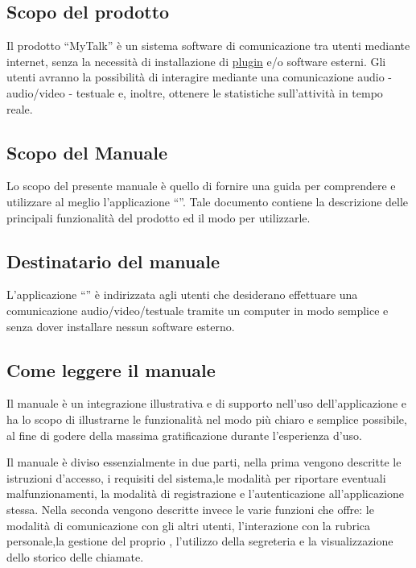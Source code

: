 \subsection{Scopo del prodotto}
Il prodotto ``MyTalk'' è un sistema software di comunicazione tra utenti mediante \underline{} internet, senza la necessità di installazione di \underline{plugin} e/o software esterni. Gli utenti avranno la possibilità di interagire mediante una comunicazione audio - audio/video - testuale e, inoltre, ottenere le statistiche sull'attività in tempo reale.

\subsection{Scopo del Manuale}
Lo scopo del presente manuale è quello di fornire una guida per comprendere e utilizzare al meglio l'applicazione ``\caName''.
Tale documento contiene la descrizione delle principali funzionalità del prodotto ed il modo
per utilizzarle.

\subsection{Destinatario del manuale}
L'applicazione  ``\caName'' è indirizzata agli utenti che desiderano effettuare una comunicazione audio/video/testuale tramite un computer in modo semplice  e senza dover installare nessun software esterno.  

\subsection{Come leggere il manuale}
Il manuale è un integrazione illustrativa e di supporto nell'uso dell'applicazione \caName{} e ha lo scopo di illustrarne le funzionalità nel modo più chiaro e semplice possibile, al fine di godere della massima gratificazione durante l'esperienza d'uso.

Il manuale è diviso essenzialmente in due parti, nella prima vengono descritte le istruzioni d'accesso, i requisiti del sistema,le modalità per riportare eventuali malfunzionamenti, la modalità di registrazione e l'autenticazione all'applicazione stessa. 
Nella seconda vengono descritte invece le varie funzioni che \caName{} offre: le modalità di comunicazione con gli altri utenti, l'interazione con la rubrica personale,la gestione del proprio \underline{}, l'utilizzo della segreteria e la visualizzazione dello storico delle chiamate.

